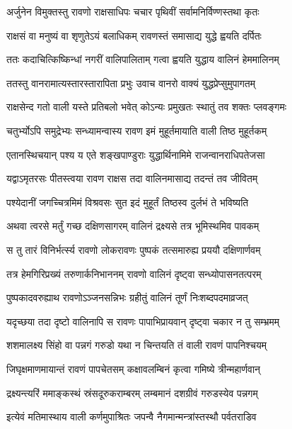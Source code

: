 
\twolineshloka
{अर्जुनेन विमुक्तस्तु रावणो राक्षसाधिपः}
{चचार पृथिवीं सर्वामनिर्विण्णस्तथा कृतः} %

\twolineshloka
{राक्षसं वा मनुष्यं वा शृणुतेऽयं बलाधिकम्}
{रावणस्तं समासाद्य युद्धे ह्वयति दर्पितः} %

\twolineshloka
{ततः कदाचित्किष्किन्धां नगरीं वालिपालिताम्}
{गत्वा ह्वयति युद्धाय वालिनं हेममालिनम्} %

\twolineshloka
{ततस्तु वानरामात्यस्तारस्तारापिता प्रभुः}
{उवाच वानरो वाक्यं युद्धप्रेप्सुमुपागतम्} %

\twolineshloka
{राक्षसेन्द गतो वाली यस्ते प्रतिबलो भवेत्}
{कोऽन्यः प्रमुखतः स्थातुं तव शक्तः प्लवङ्गमः} %

\twolineshloka
{चतुर्भ्योऽपि समुद्रेभ्यः सन्ध्यामन्वास्य रावण}
{इमं मुहूर्तमायाति वाली तिष्ठ मुहूर्तकम्} %

\twolineshloka
{एतानस्थिचयान् पश्य य एते शङ्खपाण्डुराः}
{युद्धार्थिनामिमे राजन्वानराधिपतेजसा} %

\twolineshloka
{यद्वाऽमृतरसः पीतस्त्वया रावण राक्षस}
{तदा वालिनमासाद्य तदन्तं तव जीवितम्} %

\twolineshloka
{पश्येदानीं जगच्चित्रमिमं विश्रवसः सुत}
{इदं मुहूर्तं तिष्ठस्व दुर्लभं ते भविष्यति} %

\twolineshloka
{अथवा त्वरसे मर्तुं गच्छ दक्षिणसागरम्}
{वालिनं द्रक्ष्यसे तत्र भूमिस्थमिव पावकम्} %

\twolineshloka
{स तु तारं विनिर्भर्त्स्य रावणो लोकरावणः}
{पुष्पकं तत्समारुह्य प्रययौ दक्षिणार्णवम्} %

\twolineshloka
{तत्र हेमगिरिप्रख्यं तरुणार्कनिभाननम्}
{रावणो वालिनं दृष्ट्वा सन्ध्योपासनतत्परम्} %

\twolineshloka
{पुष्पकादवरुह्याथ रावणोऽञ्जनसन्निभः}
{ग्रहीतुं वालिनं तूर्णं निःशब्दपदमाव्रजत्} %

\twolineshloka
{यदृच्छया तदा दृष्टो वालिनापि स रावणः}
{पापाभिप्रायवान् दृष्ट्वा चकार न तु सम्भ्रमम्} %

\twolineshloka
{शशमालक्ष्य सिंहो वा पन्नगं गरुडो यथा}
{न चिन्तयति तं वाली रावणं पापनिश्चयम्} %

\twolineshloka
{जिघृक्षमाणमायान्तं रावणं पापचेतसम्}
{कक्षावलम्बिनं कृत्वा गमिष्ये त्रीन्महार्णवान्} %

\twolineshloka
{द्रक्ष्यन्त्यरिं ममाङ्कस्थं स्रंसदूरुकराम्बरम्}
{लम्बमानं दशग्रीवं गरुडस्येव पन्नगम्} %

\twolineshloka
{इत्येवं मतिमास्थाय वाली कर्णमुपाश्रितः}
{जपन्वै नैगमान्मन्त्रांस्तस्थौ पर्वतराडिव} %

